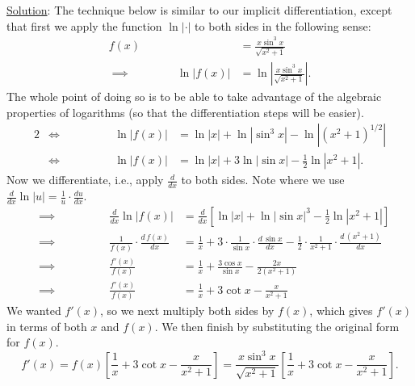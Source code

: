 \underline{Solution}: The technique below is similar
to our implicit differentiation, except that first we
apply the function $\ln|\cdot|$ to both sides in the following sense:
\begin{align*}
f(x)&=\frac{x\sin^3 x}{\sqrt{x^2+1}}\\
\implies\qquad\qquad \ln|f(x)|&=\ln\left|\frac{x\sin^3 x}{\sqrt{x^2+1}}\right|.
\end{align*}
The whole point of doing so is to be able to take advantage
of the algebraic properties of logarithms (so that 
the differentiation steps will be easier).
\begin{alignat*}{2}
&\iff&\ln|f(x)|&=\ln|x|+\ln\left|\sin^3x\right|-\ln\left|(x^2+1)^{1/2}
               \right|\\
&\iff\qquad\qquad&
        \ln|f(x)|&=\ln|x|+3\ln|\sin x|-\frac12\ln|x^2+1|.
\end{alignat*}
Now we differentiate, i.e., apply $\frac{d}{dx}$ to both 
sides.  Note where we use $\frac{d}{dx}\ln|u|=\frac1u\cdot\frac{du}{dx}$.
\begin{align*}
&\implies\qquad\qquad&\frac{d}{dx}\ln|f(x)|&=
                       \frac{d}{dx}\left[\ln|x|+\ln|\sin x|^3
                       -\frac12\ln|x^2+1|\right]\\
&\implies&\frac1{f(x)}\cdot\frac{d\,f(x)}{dx}&=
                   \frac1x+3\cdot\frac1{\sin x}\cdot\frac{d\,\sin x}{dx}
                   -\frac12\cdot\frac1{x^2+1}\cdot\frac{d\,(x^2+1)}{dx}\\
&\implies&\frac{f'(x)}{f(x)}&=\frac1x+\frac{3\cos x}{\sin x}
                   -\frac{2x}{2(x^2+1)}\\
&\implies&\frac{f'(x)}{f(x)}&=\frac1x+3\cot x-\frac{x}{x^2+1}
\end{align*}
We wanted $f'(x)$, so we next multiply both sides by
$f(x)$, which gives $f'(x)$ in terms of both $x$ and $f(x)$.
We then finish by substituting the original form for $f(x)$.
$$f'(x)=f(x)\left[\frac1x+3\cot x-\frac{x}{x^2+1}\right]
=\frac{x\sin^3 x}{\sqrt{x^2+1}}\left[\frac1x+3\cot x-\frac{x}{x^2+1}\right].$$
\eex 

